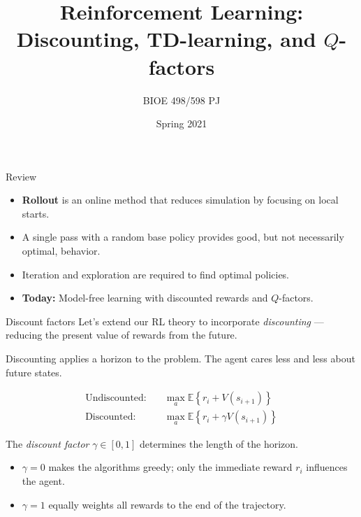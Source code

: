 \documentclass[9pt]{beamer}
\title{Reinforcement Learning:\\Discounting, TD-learning, and $Q$-factors}
\author{BIOE 498/598 PJ}
\date{Spring 2021}
\newcommand\lspace{\addtolength{\itemsep}{0.5\baselineskip}}
\begin{document}
\frame{\titlepage}


\begin{frame}{Review}

\begin{itemize}\lspace
	\item \textbf{Rollout} is an online method that reduces simulation by focusing on local starts.
	\item A single pass with a random base policy provides good, but not necessarily optimal, behavior.
	\item Iteration and exploration are required to find optimal policies.
	\item<2-> \textbf{Today:} Model-free learning with discounted rewards and $Q$-factors.
\end{itemize}

\end{frame}

\begin{frame}{Discount factors}
	Let's extend our RL theory to incorporate \emph{discounting} --- reducing the present value of rewards from the future.
	
	\bigskip
	Discounting applies a horizon to the problem. The agent cares less and less about future states.
	
	\pause
	\begin{align*}
		\text{Undiscounted:}&\quad \max_{a} \mathbb{E}\left\{ r_i + V(s_{i+1}) \right\} \\
		\text{Discounted:}&\quad \max_{a} \mathbb{E}\left\{ r_i + \gamma V(s_{i+1}) \right\}
	\end{align*}
	
	\pause
	The \emph{discount factor} $\gamma \in [0,1]$ determines the length of the horizon.
	\medskip
	\begin{itemize}\lspace
		\item $\gamma=0$ makes the algorithms greedy; only the immediate reward $r_i$ influences the agent.
		\item $\gamma=1$ equally weights all rewards to the end of the trajectory.
	\end{itemize}

\end{frame}
\end{document}
